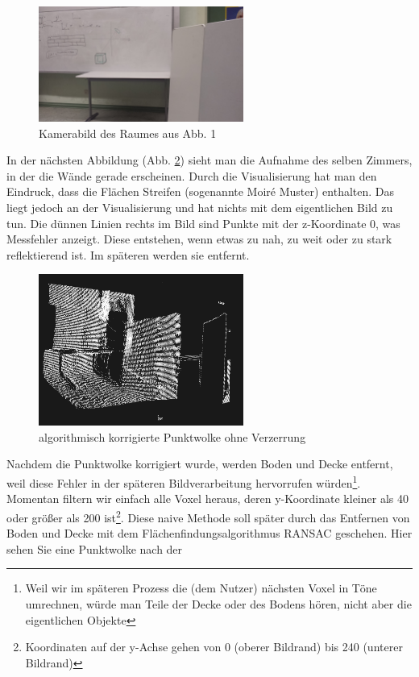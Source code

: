 \documentclass[a4paper,12pt,ngerman]{scrartcl}
\begin{document}
\begin{figure}[H]
	\centering
	\includegraphics[angle=180,width=0.6\textwidth]{20180125_171703}
	\caption{Kamerabild des Raumes aus Abb. 1}
	\label{room_at_school}
\end{figure}
\par In der nächsten Abbildung (Abb. \ref{before_filtering}) sieht
man die Aufnahme des selben Zimmers, in der die Wände gerade erscheinen. Durch die Visualisierung hat man
den Eindruck, dass die Flächen Streifen (sogenannte Moir\'{e} Muster) enthalten. Das liegt jedoch an der
Visualisierung und hat nichts mit dem eigentlichen Bild zu tun. Die dünnen Linien rechts im Bild sind Punkte
mit der z-Koordinate 0, was Messfehler anzeigt. Diese entstehen, wenn etwas zu nah, zu weit oder zu stark
reflektierend ist. Im späteren werden sie entfernt.
\begin{figure}[H]
	\centering
	\includegraphics[width=0.6\textwidth]{before_filtering}
	\caption{algorithmisch korrigierte Punktwolke ohne Verzerrung}
	\label{before_filtering}
\end{figure} \par
Nachdem die Punktwolke korrigiert wurde, werden Boden und Decke entfernt, weil diese Fehler in 
der späteren Bildverarbeitung hervorrufen würden\footnote{Weil wir im späteren Prozess die (dem Nutzer) nächsten Voxel
in Töne umrechnen, würde man Teile der Decke oder des Bodens hören, nicht aber die eigentlichen Objekte}.
 Momentan filtern
wir einfach alle Voxel heraus, deren y-Koordinate kleiner als 40 oder größer als 200 ist\footnote{Koordinaten auf der y-Achse gehen von 0 (oberer Bildrand) bis 240 (unterer Bildrand)}. Diese naive Methode soll später durch das Entfernen von Boden und Decke mit dem Flächenfindungsalgorithmus RANSAC geschehen. Hier sehen Sie eine Punktwolke nach der
\end{document}
